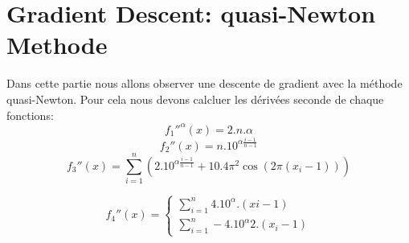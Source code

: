 \documentclass[twoside,10pt,a4paper]{article}
\numberwithin{equation}{section}					%
\numberwithin{figure}{section}						%
\begin{document}
\section{Gradient Descent: quasi-Newton Methode}\label{sec:section2}
Dans cette partie nous allons observer une descente de gradient avec la méthode quasi-Newton. Pour cela nous devons calcluer les dérivées seconde de chaque fonctions: 
\begin{equation}
    f_1''^{\alpha}(x) = 2.n.\alpha
    \label{eq:simple}		%
\end{equation}
\begin{equation}
    f_2''(x) = n.10^{\alpha \frac {i-1} {n-1}}
    \label{eq:simple}		%
\end{equation}
\begin{equation}
    f_3''(x) = \sum_{i=1}^{n} (2.10^{\alpha \frac {i-1} {n-1}} + 10.4\pi^{2}\cos(2\pi(x_i - 1)))
    \label{eq:simple}		%
\end{equation}
\begin{sloppypar}
\begin{equation}
    f_4''(x) =
    \begin{cases} 
        \sum_{i=1}^{n} 4.10^{\alpha}.(xi - 1)  \\
        \sum_{i=1}^{n} -4.10^{\alpha}2.(x_i -1) 
    \end{cases}
    \label{eq:simple}		%
\end{equation}
\end{sloppypar}
\end{document}
